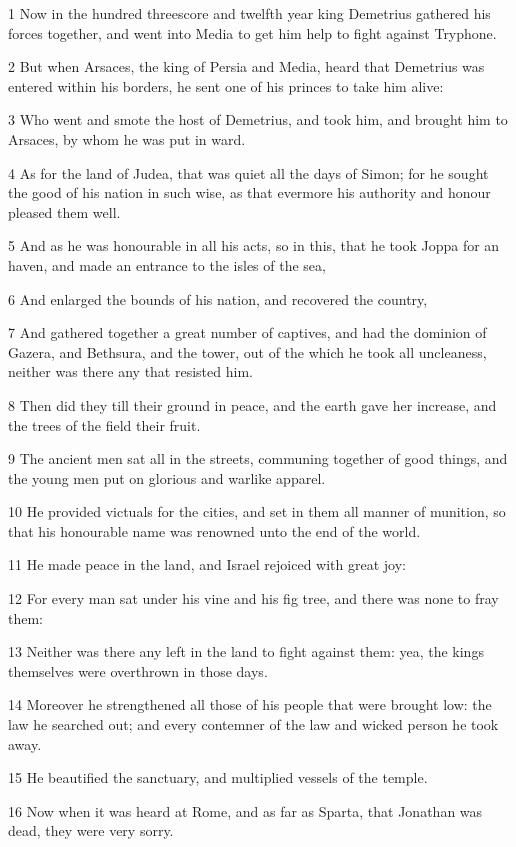 \par 1 Now in the hundred threescore and twelfth year king Demetrius gathered his forces together, and went into Media to get him help to fight against Tryphone.
\par 2 But when Arsaces, the king of Persia and Media, heard that Demetrius was entered within his borders, he sent one of his princes to take him alive:
\par 3 Who went and smote the host of Demetrius, and took him, and brought him to Arsaces, by whom he was put in ward.
\par 4 As for the land of Judea, that was quiet all the days of Simon; for he sought the good of his nation in such wise, as that evermore his authority and honour pleased them well.
\par 5 And as he was honourable in all his acts, so in this, that he took Joppa for an haven, and made an entrance to the isles of the sea,
\par 6 And enlarged the bounds of his nation, and recovered the country,
\par 7 And gathered together a great number of captives, and had the dominion of Gazera, and Bethsura, and the tower, out of the which he took all uncleaness, neither was there any that resisted him.
\par 8 Then did they till their ground in peace, and the earth gave her increase, and the trees of the field their fruit.
\par 9 The ancient men sat all in the streets, communing together of good things, and the young men put on glorious and warlike apparel.
\par 10 He provided victuals for the cities, and set in them all manner of munition, so that his honourable name was renowned unto the end of the world.
\par 11 He made peace in the land, and Israel rejoiced with great joy:
\par 12 For every man sat under his vine and his fig tree, and there was none to fray them:
\par 13 Neither was there any left in the land to fight against them: yea, the kings themselves were overthrown in those days.
\par 14 Moreover he strengthened all those of his people that were brought low: the law he searched out; and every contemner of the law and wicked person he took away.
\par 15 He beautified the sanctuary, and multiplied vessels of the temple.
\par 16 Now when it was heard at Rome, and as far as Sparta, that Jonathan was dead, they were very sorry.
